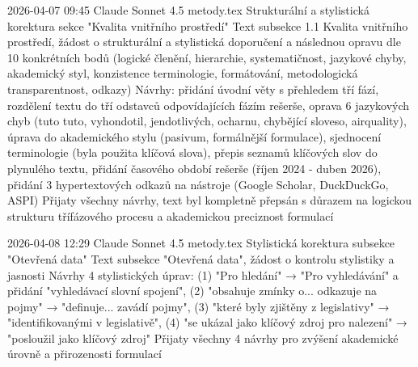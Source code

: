 

\logentry
  {2026-04-07 09:45}
  {Claude Sonnet 4.5}
  {metody.tex}
  {Strukturální a stylistická korektura sekce "Kvalita vnitřního prostředí"}
  {Text subsekce 1.1 Kvalita vnitřního prostředí, žádost o strukturální a stylistická doporučení a následnou opravu dle 10 konkrétních bodů (logické členění, hierarchie, systematičnost, jazykové chyby, akademický styl, konzistence terminologie, formátování, metodologická transparentnost, odkazy)}
  {Návrhy: přidání úvodní věty s přehledem tří fází, rozdělení textu do tří odstavců odpovídajících fázím rešerše, oprava 6 jazykových chyb (tuto tuto, vyhondotil, jendotlivých, ocharnu, chybějící sloveso, airquality), úprava do akademického stylu (pasivum, formálnější formulace), sjednocení terminologie (byla použita klíčová slova), přepis seznamů klíčových slov do plynulého textu, přidání časového období rešerše (říjen 2024 - duben 2026), přidání 3 hypertextových odkazů na nástroje (Google Scholar, DuckDuckGo, ASPI)}
  {Přijaty všechny návrhy, text byl kompletně přepsán s důrazem na logickou strukturu třífázového procesu a akademickou preciznost formulací}

\logentry
  {2026-04-08 12:29}
  {Claude Sonnet 4.5}
  {metody.tex}
  {Stylistická korektura subsekce "Otevřená data"}
  {Text subsekce "Otevřená data", žádost o kontrolu stylistiky a jasnosti}
  {Návrhy 4 stylistických úprav: (1) "Pro hledání" → "Pro vyhledávání" a přidání "vyhledávací slovní spojení", (2) "obsahuje zmínky o... odkazuje na pojmy" → "definuje... zavádí pojmy", (3) "které byly zjištěny z legislativy" → "identifikovanými v legislativě", (4) "se ukázal jako klíčový zdroj pro nalezení" → "posloužil jako klíčový zdroj"}
  {Přijaty všechny 4 návrhy pro zvýšení akademické úrovně a přirozenosti formulací}
